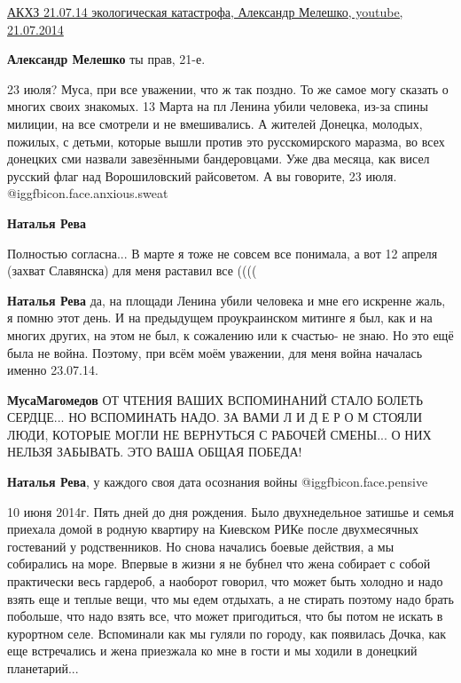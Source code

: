 \begin{itemize}
\href{https://youtu.be/a6HcNbYIeYE}{%
АКХЗ 21.07.14 экологическая катастрофа, Александр Мелешко, youtube, 21.07.2014%
}

\textbf{Александр Мелешко} ты прав, 21-е.


23 июля? Муса, при все уважении, что ж так поздно. То же самое могу сказать о
многих своих знакомых. 13 Марта на пл Ленина убили человека, из-за спины
милиции, на все смотрели и не вмешивались. А жителей Донецка, молодых,
пожилых, с детьми, которые вышли против это русскомирского маразма, во всех
донецких сми назвали завезёнными бандеровцами. Уже два месяца, как висел
русский флаг над Ворошиловский райсоветом. А вы говорите, 23 июля.  @igg{fbicon.face.anxious.sweat} 

\begin{itemize} %
\textbf{Наталья Рева} 

Полностью согласна... В марте я тоже не совсем все понимала, а вот 12 апреля
(захват Славянска) для меня раставил все ((((

\textbf{Наталья Рева} да, на площади Ленина убили человека и мне его искренне жаль, я помню этот день. И на предыдущем проукраинском митинге я был, как и на многих других, на этом не был, к сожалению или к счастью- не знаю.
Но это ещё была не война.
Поэтому, при всём моём уважении, для меня война началась именно 23.07.14.

\textbf{МусаМагомедов} ОТ ЧТЕНИЯ ВАШИХ ВСПОМИНАНИЙ СТАЛО БОЛЕТЬ СЕРДЦЕ...
НО ВСПОМИНАТЬ НАДО. ЗА ВАМИ Л И Д Е Р О М СТОЯЛИ ЛЮДИ, КОТОРЫЕ МОГЛИ НЕ ВЕРНУТЬСЯ С РАБОЧЕЙ СМЕНЫ...
О НИХ НЕЛЬЗЯ ЗАБЫВАТЬ. ЭТО ВАША ОБЩАЯ ПОБЕДА!

\textbf{Наталья Рева}, у каждого своя дата осознания войны  @igg{fbicon.face.pensive} 
\end{itemize} %


10 июня 2014г. Пять дней до дня рождения. Было двухнедельное затишье и семья
приехала домой в родную квартиру на Киевском РИКе после двухмесячных гостеваний
у родственников. Но снова начались боевые действия, а мы собирались на море.
Впервые в жизни я не бубнел что жена собирает с собой практически весь
гардероб, а наоборот говорил, что может быть холодно и надо взять еще и теплые
вещи, что мы едем отдыхать, а не стирать поэтому надо брать побольше, что надо
взять все, что может пригодиться, что бы потом не искать в курортном селе.
Вспоминали как мы гуляли по городу, как появилась Дочка, как еще встречались и
жена приезжала ко мне в гости и мы ходили в донецкий планетарий... 


\end{itemize}
